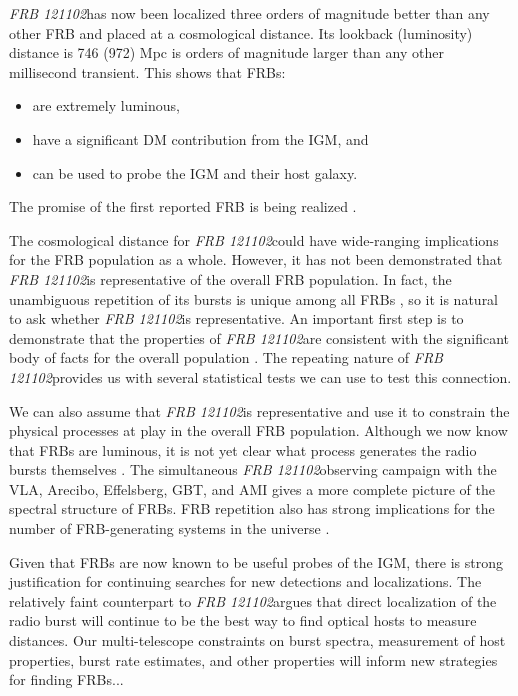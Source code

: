 \documentclass{emulateapj}
\newcommand{\frb}{\emph{FRB 121102}}
\begin{document}
\frb has now been localized three orders of magnitude better than any other FRB and placed at a cosmological distance. Its lookback (luminosity) distance is 746 (972) Mpc \citep{planck15} is orders of magnitude larger than any other millisecond transient. This shows that FRBs:
\begin{itemize}
 \item are extremely luminous, 
 \item have a significant DM contribution from the IGM, and
 \item can be used to probe the IGM and their host galaxy.
\end{itemize}
The promise of the first reported FRB is being realized \citep{2007Sci...318..777L}.

The cosmological distance for \frb could have wide-ranging implications for the FRB population as a whole. However, it has not been demonstrated that \frb is representative of the overall FRB population. In fact, the unambiguous repetition of its bursts is unique among all FRBs \citep{2015MNRAS.454..457P}, so it is natural to ask whether \frb is representative. An important first step is to demonstrate that the properties of \frb are consistent with the significant body of facts for the overall population \citep{2015MNRAS.451.3278M, 2016MPLA...3130013K}. The repeating nature of \frb provides us with several statistical tests we can use to test this connection.

We can also assume that \frb is representative and use it to constrain the physical processes at play in the overall FRB population. Although we now know that FRBs are luminous, it is not yet clear what process generates the radio bursts themselves \citep{2014PhRvD..89j3009K, 2014ApJ...785L..26L, 2016MNRAS.457..232C}. The simultaneous \frb observing campaign with the VLA, Arecibo, Effelsberg, GBT, and AMI gives a more complete picture of the spectral structure of FRBs. FRB repetition also has strong implications for the number of FRB-generating systems in the universe \citep{2016MNRAS.458L..89C}.

Given that FRBs are now known to be useful probes of the IGM, there is strong justification for continuing searches for new detections and localizations. The relatively faint counterpart to \frb argues that direct localization of the radio burst will continue to be the best way to find optical hosts to measure distances. Our multi-telescope constraints on burst spectra, measurement of host properties, burst rate estimates, and other properties will inform new strategies for finding FRBs...
\end{document}
